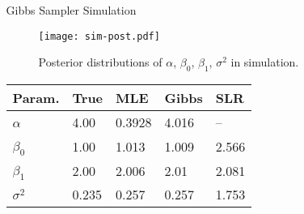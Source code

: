 \documentclass[final]{beamer}
\newlength{\sepwid}
\newlength{\onecolwid}
\newlength{\twocolwid}
\begin{document}
\begin{frame}[t]
\begin{columns}[t]
\begin{column}{\twocolwid}
\begin{columns}[t,totalwidth=\twocolwid]
\begin{column}{\onecolwid}
\end{column} %

\begin{column}{\onecolwid} %


\begin{block}{Gibbs Sampler Simulation}

\begin{figure}
\texttt{[image: sim-post.pdf]}
\caption{Posterior distributions of $\alpha$, $\beta_0$, $\beta_1$, $\sigma^2$ in simulation.}
\end{figure}

\begin{table}
\vspace{0ex}
\begin{tabular}{l l l l l}
\toprule
\textbf{Param.} & \textbf{True} & \textbf{MLE} & \textbf{Gibbs} & \textbf{SLR}\\
\midrule
$\alpha$  \ & 4.00 & 0.3928  & 4.016 & -- \\
$\beta_0$ \  & 1.00 & 1.013 & 1.009 & 2.566\\
$\beta_1$ \  & 2.00 & 2.006 & 2.01 & 2.081\\
$\sigma^2$ \  & 0.235 & 0.257 & 0.257 & 1.753\\
\bottomrule
\end{tabular}

\end{table}

\end{block}


\end{column} %

\end{columns} %

\end{column} %

\begin{column}{\sepwid}\end{column} %

\begin{column}{\onecolwid} %


\end{column}
\end{columns}
\end{frame}
\end{document}
